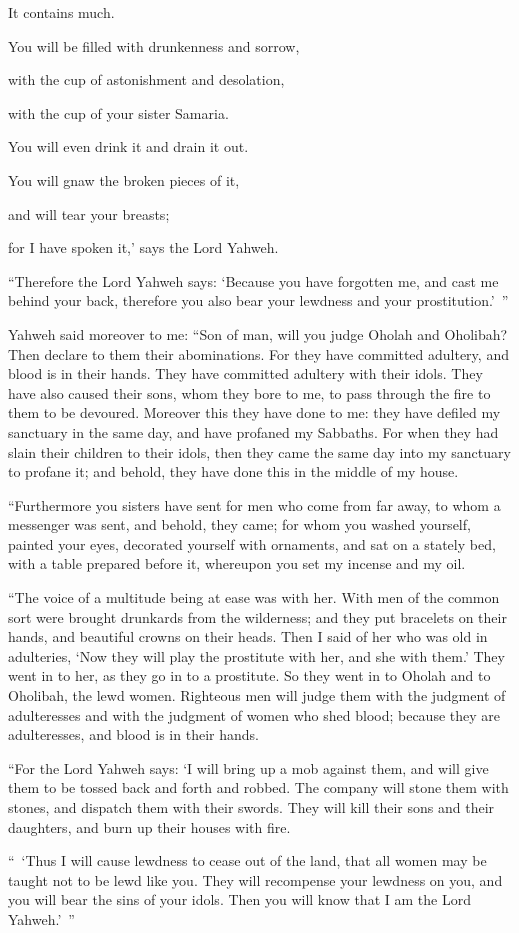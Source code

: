 {\par }{\QB It contains much.
\par }{\Q {}You will be filled with drunkenness and sorrow,
\par }{\QB with the cup of astonishment and desolation,
\par }{\QB with the cup of your sister Samaria.
\par }{\Q {}You will even drink it and drain it out.
\par }{\QB You will gnaw the broken pieces of it,
\par }{\QB and will tear your breasts;
\par }{\MM for I have spoken it,’ says the Lord Yahweh.
\par }{\PP {}“Therefore the Lord Yahweh says: ‘Because you have forgotten me, and cast me behind your back, therefore you also bear your lewdness and your prostitution.’ ”
\par }{\PP {}Yahweh said moreover to me: “Son of man, will you judge Oholah and Oholibah? Then declare to them their abominations.
For they have committed adultery, and blood is in their hands. They have committed adultery with their idols. They have also caused their sons, whom they bore to me, to pass through the fire to them to be devoured.
Moreover this they have done to me: they have defiled my sanctuary in the same day, and have profaned my Sabbaths.
For when they had slain their children to their idols, then they came the same day into my sanctuary to profane it; and behold, they have done this in the middle of my house.
\par }{\PP {}“Furthermore you sisters have sent for men who come from far away, to whom a messenger was sent, and behold, they came; for whom you washed yourself, painted your eyes, decorated yourself with ornaments,
and sat on a stately bed, with a table prepared before it, whereupon you set my incense and my oil.
\par }{\PP {}“The voice of a multitude being at ease was with her. With men of the common sort were brought drunkards from the wilderness; and they put bracelets on their hands, and beautiful crowns on their heads.
Then I said of her who was old in adulteries, ‘Now they will play the prostitute with her, and she with them.’
They went in to her, as they go in to a prostitute. So they went in to Oholah and to Oholibah, the lewd women.
Righteous men will judge them with the judgment of adulteresses and with the judgment of women who shed blood; because they are adulteresses, and blood is in their hands.
\par }{\PP {}“For the Lord Yahweh says: ‘I will bring up a mob against them, and will give them to be tossed back and forth and robbed.
The company will stone them with stones, and dispatch them with their swords. They will kill their sons and their daughters, and burn up their houses with fire.
\par }{\PP {}“ ‘Thus I will cause lewdness to cease out of the land, that all women may be taught not to be lewd like you.
They will recompense your lewdness on you, and you will bear the sins of your idols. Then you will know that I am the Lord Yahweh.’ ”

}

